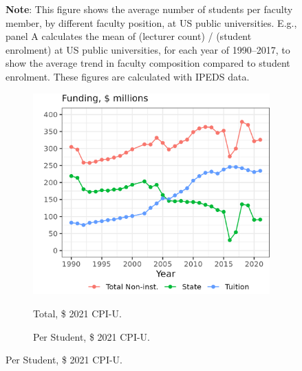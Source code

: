 \begin{figure}[H]
    \justify
    \footnotesize
    \textbf{Note}:
    This figure shows the average number of students per faculty member, by different faculty position, at US public universities.
    E.g., panel A calculates the mean of (lecturer count) / (student enrolment) at US public universities, for each year of 1990--2017, to show the average trend in faculty composition compared to student enrolment.
    These figures are calculated with IPEDS data.
\end{figure}

\newpage
\begin{figure}[H]
    \centering
    \singlespacing
    \caption{Mean Funding Sources among Illinois Public Universities, by Year.}
    \begin{subfigure}[b]{0.495\textwidth}
        \centering
        \caption{Total, \$ 2021 CPI-U.}
        \includegraphics[width=\textwidth]{figures/illinois-funding-total.png}
        \label{fig:illinois-funding-total}
    \end{subfigure}
    \begin{subfigure}[b]{0.495\textwidth}
        \centering
        \caption{Per Student, \$ 2021 CPI-U.}

\end{subfigure}
\end{figure}
